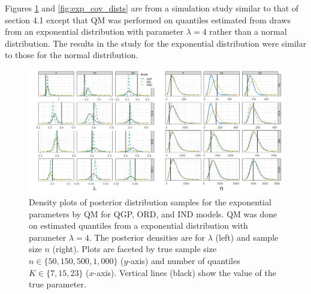 \documentclass[preprint,12pt,authoryear]{elsarticle}
\begin{document}
\newpage
Figures \ref{fig:exp_dens} and \ref{fig:exp_cov_dists} are from a simulation 
study similar to that of section 4.1 
except that QM was performed on
quantiles estimated from draws from an exponential distribution with 
parameter $\lambda = 4$ rather than a normal distribution. 
The results in the study for the exponential distribution were similar 
to those for the normal
distribution.


\begin{figure}[hbt!]
\centering
  \includegraphics[width = 1.1\linewidth]{Images/exp_params_fit.png}
\caption{Density plots of posterior distribution samples for the exponential 
parameters by QM for QGP,
ORD, and IND models. QM was done on estimated quantiles from a exponential 
distribution with parameter
$\lambda = 4$. The posterior densities are for $\lambda$
(left) and sample size $n$ (right). 
Plots are faceted by true sample
size $n \in \{50, 150, 500, 1,000\}$ ($y$-axis) and number of quantiles 
$K \in \{7, 15, 23\}$ 
($x$-axis). Vertical lines (black)
show the value of the true parameter.}
\label{fig:exp_dens}
\end{figure}
\end{document}
